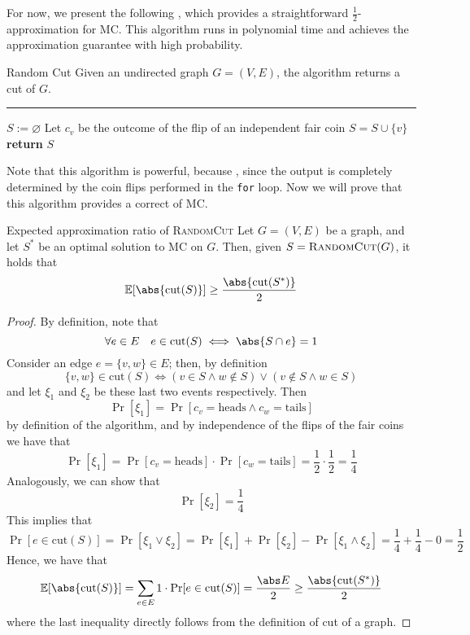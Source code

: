 \documentclass[a4paper, 12pt]{report}
\begin{document}
    For now, we present the following , which provides a straightforward $\frac{1}{2}$-approximation for MC. This algorithm runs in polynomial time and achieves the approximation guarantee with high probability.

    \begin{framedalgo}{Random Cut}
        Given an undirected graph $G = (V, E)$, the algorithm returns a cut of $G$. \\
        \hrule

        \quad
        \begin{algorithmic}[1]
                \State $S := \varnothing$
                    \State Let $c_v$ be the outcome of the flip of an independent fair coin
                        \State $S = S \cup \{v\}$
                    \EndIf
                \EndFor
                \State \textbf{return} $S$
            \EndFunction
        \end{algorithmic}
    \end{framedalgo}

    Note that this algorithm is powerful, because , since the output is completely determined by the coin flips performed in the \texttt{for} loop. Now we will prove that this algorithm provides a correct  of MC.
    
    \begin{framedthm}[label={expected random cut}]{Expected approximation ratio of \textsc{RandomCut}}
        Let $G= (V, E)$ be a graph, and let $S^*$ be an optimal solution to MC on $G$. Then, given $S = \textsc{RandomCut}(G)$, it holds that $$\mathbb E [\abs{\mathrm{cut}(S)}] \ge \dfrac{\abs{\mathrm{cut}(S^*)}}{2}$$
    \end{framedthm}

    \begin{proof}
        By definition, note that $$\forall e \in E \quad e \in \mathrm{cut}(S) \iff \abs{S \cap e} = 1$$ Consider an edge $e = \{v, w\} \in E$; then, by definition $$\{v, w\} \in \mathrm{cut}(S) \iff (v \in S \land w \notin S) \lor (v \notin S \land w \in S)$$ and let $\xi_1$ and $\xi_2$ be these last two events respectively. Then $$\Pr[\xi_1] = \Pr[c_v = \mathrm{heads} \land c_w = \mathrm{tails}]$$ by definition of the algorithm, and by independence of the flips of the fair coins we have that $$\Pr[\xi_1] = \Pr[c_v = \mathrm{heads}] \cdot \Pr[c_w = \mathrm{tails}] = \dfrac{1}{2} \cdot \dfrac{1}{2} = \dfrac{1}{4}$$ Analogously, we can show that $$\Pr[\xi_2] = \dfrac{1}{4}$$ This implies that $$\Pr[e \in \mathrm{cut}(S)] = \Pr[\xi_1 \lor \xi_2] = \Pr[\xi_1] + \Pr[\xi_2] - \Pr[\xi_1 \land \xi_2] = \dfrac{1}{4} + \dfrac{1}{4} - 0 = \dfrac{1}{2}$$ Hence, we have that $$\mathbb E [\abs{\mathrm{cut}(S)}] = \sum_{e \in E}{1 \cdot \Pr[e \in \mathrm{cut}(S)]} = \dfrac{\abs E}{2} \ge \dfrac{\abs{\mathrm{cut}(S^*)}}{2}$$ where the last inequality directly follows from the definition of cut of a graph.
    \end{proof}
\end{document}
